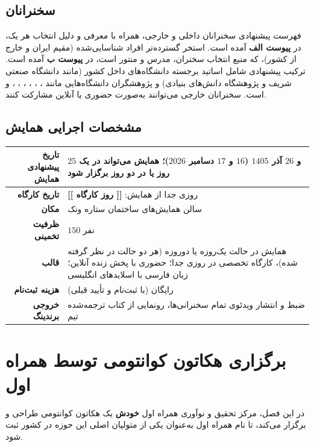 \documentclass[a4paper,12pt]{article}
\newcommand{\placeholder}[1]{%
	\textcolor{mci-gold}{\textbf{[[ #1 ]]}}%
}
\begin{document}
	\subsection{سخنرانان}
	فهرست پیشنهادی سخنرانان داخلی و خارجی، همراه با معرفی و دلیل انتخاب هر یک،
	در \textbf{پیوست الف} آمده است. استخر گسترده‌تر افراد شناسایی‌شده (مقیم ایران و خارج از کشور)، که منبع انتخاب سخنران، مدرس و منتور است، در \textbf{پیوست ب} آمده است. ترکیب پیشنهادی شامل اساتید برجسته دانشگاه‌های
	داخل کشور (مانند دانشگاه صنعتی شریف و پژوهشگاه دانش‌های بنیادی) و پژوهشگران
	دانشگاه‌هایی مانند ، ، ، ،
	، ،  و  است. سخنرانان خارجی
	می‌توانند به‌صورت حضوری یا آنلاین مشارکت کنند.

	\subsection{مشخصات اجرایی همایش}
	\begin{tabularx}{\textwidth}{>{\bfseries\color{mci-blue}}r X}
		\toprule
		تاریخ پیشنهادی همایش & $25$ و $26$ آذر $1405$ ($16$ و $17$ دسامبر $2026$)؛ همایش می‌تواند در یک روز یا در دو روز برگزار شود \\
		\midrule
		تاریخ کارگاه & روزی جدا از همایش: \placeholder{روز کارگاه} \\
		\midrule
		مکان & سالن همایش‌های ساختمان ستاره ونک \\
		\midrule
		ظرفیت تخمینی & $150$ نفر \\
		\midrule
		قالب & همایش در حالت یک‌روزه یا دوروزه (هر دو حالت در نظر گرفته شده)، کارگاه تخصصی در روزی جدا؛ حضوری با پخش زنده آنلاین؛ زبان فارسی با اسلایدهای انگلیسی \\
		\midrule
		هزینه ثبت‌نام & رایگان (با ثبت‌نام و تأیید قبلی) \\
		\midrule
		خروجی برندینگ & ضبط و انتشار ویدئوی تمام سخنرانی‌ها، رونمایی از کتاب ترجمه‌شده تیم \\
		\bottomrule
	\end{tabularx}

	\section{برگزاری هکاتون کوانتومی توسط همراه اول}

	در این فصل، مرکز تحقیق و نوآوری همراه اول \textbf{خودش} یک هکاتون کوانتومی طراحی و برگزار می‌کند،
	تا نام همراه اول به‌عنوان یکی از متولیان اصلی این حوزه در کشور ثبت شود.
\end{document}
